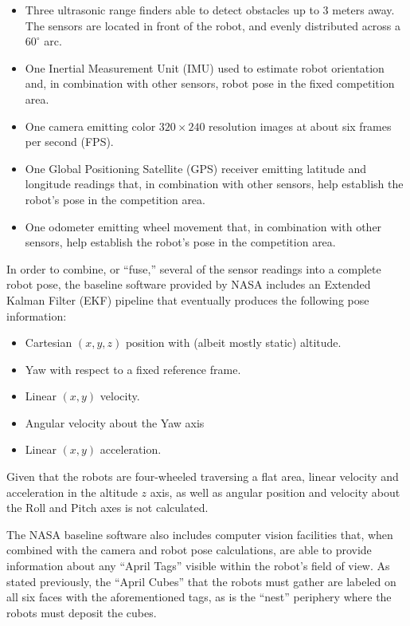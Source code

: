 \documentclass[sigconf,authordraft]{acmart}
\begin{document}
\begin{itemize}
  \item Three ultrasonic range finders able to detect obstacles up to 3 meters
  away. The sensors are located in front of the robot, and evenly distributed
  across a $60^{\circ}$ arc.
  \item One Inertial Measurement Unit (IMU) used to estimate robot orientation
  and, in combination with other sensors, robot pose in the fixed competition
  area.
  \item One camera emitting color $320 \times 240$ resolution images at about
  six frames per second (FPS).
  \item One Global Positioning Satellite (GPS) receiver emitting latitude and
  longitude readings that, in combination with other sensors, help establish the
  robot's pose in the competition area.
  \item One odometer emitting wheel movement that, in combination with other
  sensors, help establish the robot's pose in the competition area.
\end{itemize}

In order to combine, or ``fuse,'' several of the sensor readings into a complete
robot pose, the baseline software provided by NASA includes an Extended Kalman
Filter (EKF) pipeline that eventually produces the following pose information:

\begin{itemize}
  \item Cartesian $(x,y,z)$ position with (albeit mostly static) altitude.
  \item Yaw with respect to a fixed reference frame.
  \item Linear $(x,y)$ velocity.
  \item Angular velocity about the Yaw axis
  \item Linear $(x,y)$ acceleration. 
\end{itemize}

Given that the robots are four-wheeled traversing a flat area, linear velocity
and acceleration in the altitude $z$ axis, as well as angular position and
velocity about the Roll and Pitch axes is not calculated.

The NASA baseline software also includes computer vision facilities that, when
combined with the camera and robot pose calculations, are able to provide
information about any ``April Tags'' visible within the robot's field of view.
As stated previously, the ``April Cubes'' that the robots must gather are
labeled on all six faces with the aforementioned tags, as is the ``nest''
periphery where the robots must deposit the cubes.
\end{document}
